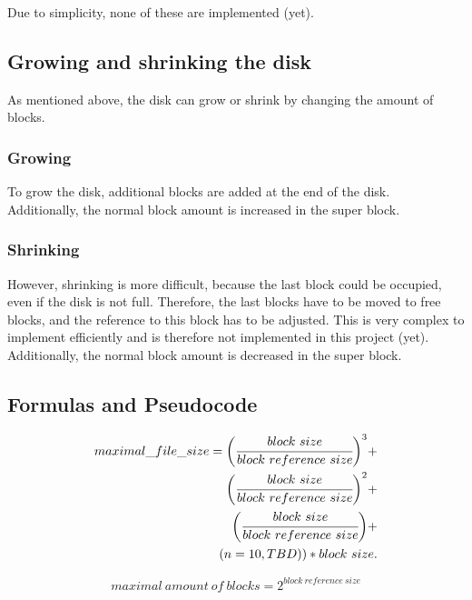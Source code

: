 Due to simplicity, none of these are implemented (yet).

\subsection{Growing and shrinking the disk}

As mentioned above, the disk can grow or shrink by changing the amount of blocks.

\subsubsection{Growing}

To grow the disk, additional blocks are added at the end of the disk. Additionally, the normal block amount is increased in the super block.

\subsubsection{Shrinking}

However, shrinking is more difficult, because the last block could be occupied, even if the disk is not full. Therefore, the last blocks have to be moved to free blocks, and the reference to this block has to be adjusted. This is very complex to implement efficiently and is therefore not implemented in this project (yet).\\
Additionally, the normal block amount is decreased in the super block.

\subsection{Formulas and Pseudocode}

\begin{equation}
\begin{split}
maximal\_file\_size =
  \bigg(\cfrac{block\ size}{block\ reference\ size}\bigg)^3 +\\
  \bigg(\cfrac{block\ size}{block\ reference\ size}\bigg)^2 +\\
  \bigg(\cfrac{block\ size}{block\ reference\ size}\bigg) +\\
  (n=10, TBD)) * block\ size.
\end{split}
\end{equation}

\begin{equation}
maximal\ amount\ of\ blocks = 2^{block\ reference\ size}
\end{equation}

